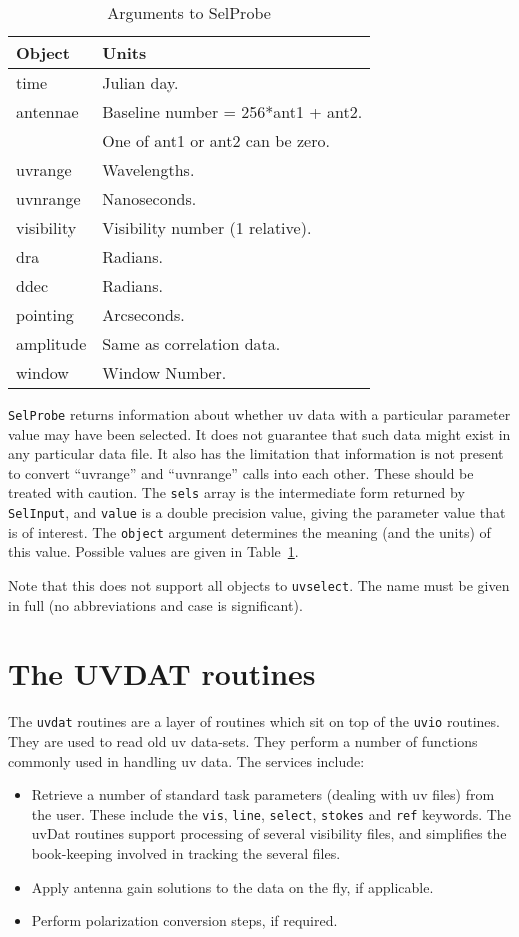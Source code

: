 \documentclass{report}
\begin{document}
\begin{table}\centering
\begin{tabular}{|l|l|}					   \hline
\bf Object	& \bf Units				\\ \hline
time		& Julian day.				\\
antennae	& Baseline number = 256*ant1 + ant2.	\\
		& One of ant1 or ant2 can be zero.	\\
uvrange		& Wavelengths.				\\
uvnrange	& Nanoseconds.				\\
visibility	& Visibility number (1 relative).	\\
dra		& Radians.				\\
ddec		& Radians.				\\
pointing	& Arcseconds.				\\
amplitude	& Same as correlation data.		\\
window		& Window Number.			\\ \hline
\end{tabular}
\caption{Arguments to SelProbe}
\label{t:selprobe}
\end{table}

{\tt SelProbe} returns information about whether uv data with a particular
parameter value may have been selected.
It does not guarantee that such data might exist
in any particular data file. It also has the limitation that
information is not present to convert ``uvrange'' and ``uvnrange''
calls into each other. These should be treated with caution. The {\tt sels}
array is the intermediate form returned by {\tt SelInput}, and {\tt value}
is a double precision value, giving the parameter value that is of interest.
The {\tt object} argument determines the meaning (and the units) of this
value. Possible values are given in Table~\ref{t:selprobe}.

Note that this does not support all objects to {\tt uvselect}.
The name must be given in full (no abbreviations and case is significant).

\section{The UVDAT routines}
The {\tt uvdat} routines are a layer of routines which sit on top of the {\tt uvio}
routines. They are used to read old uv data-sets. They perform a number of
functions commonly used in handling uv data. The services include:
\begin{itemize}
\item Retrieve a number of standard task parameters (dealing with uv files) from the
user. These include the {\tt vis}, {\tt line}, {\tt select}, {\tt stokes} and
{\tt ref} keywords. The uvDat routines support processing of several visibility
files, and simplifies the book-keeping involved in tracking the several files.
\item Apply antenna gain solutions to the data on the fly, if applicable.
\item Perform polarization conversion steps, if required.
\end{itemize}
\end{document}
